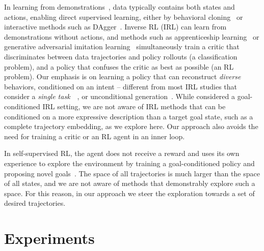 \documentclass[nohyperref]{article}
\begin{document}
In learning from demonstrations~\citep{argall2009survey}, data typically contains both states and actions, enabling direct supervised learning, either by behavioral cloning~\citep{pomerleau1988alvinn} or interactive methods such as DAgger~\citep{ross2011reduction}.
Inverse RL (IRL) can learn from demonstrations without actions, and methods such as apprenticeship learning~\citep{abbeel2004apprenticeship} or generative adversarial imitation learning~\citep{ho2016generative,peng2022ase}
simultaneously train a critic that discriminates between data trajectories and policy rollouts (a classification problem), and a policy that confuses the critic as best as possible (an RL problem). 
Our emphasis is on learning a policy that can reconstruct \textit{diverse} behaviors, conditioned on an intent -- different from most IRL studies that consider a \textit{single task}~~\citep{ho2016generative,edwards2019imitating}, or unconditional generation~\cite{peng2022ase}.
While \citet{fu2019language,ding2019goal} considered a goal-conditioned IRL setting, we are not aware of IRL methods that can be conditioned on a more expressive description than a target goal state, such as a complete trajectory embedding, as we explore here. Our approach also avoids the need for training a critic or an RL agent in an inner loop.








In self-supervised RL, the agent does not receive a reward and uses its own experience to explore the environment by training a goal-conditioned policy and proposing novel goals~\citep{pathak2018zero,ecoffet2019go,hazan2019provably,sekar2020planning,mendonca2021discovering}. The space of all trajectories is much larger than the space of all states, and we are not aware of methods that demonstrably explore such a space. For this reason, in our approach we steer the exploration towards a set of desired trajectories.






\section{Experiments}
\label{sec:experiments_top}
\end{document}
